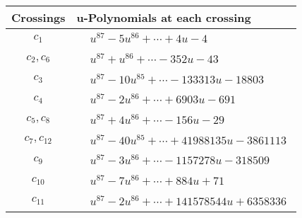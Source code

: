 \documentclass[1p]{elsarticle_modified}
\theoremstyle{definition}
\begin{document}
\begin{tabular}{m{50pt}|m{274pt}}
Crossings & \hspace{64pt}u-Polynomials at each crossing \\
\hline $$\begin{aligned}c_{1}\end{aligned}$$&$\begin{aligned}
&u^{87}-5 u^{86}+\cdots+4 u-4
\end{aligned}$\\
\hline $$\begin{aligned}c_{2},c_{6}\end{aligned}$$&$\begin{aligned}
&u^{87}+u^{86}+\cdots-352 u-43
\end{aligned}$\\
\hline $$\begin{aligned}c_{3}\end{aligned}$$&$\begin{aligned}
&u^{87}-10 u^{85}+\cdots-133313 u-18803
\end{aligned}$\\
\hline $$\begin{aligned}c_{4}\end{aligned}$$&$\begin{aligned}
&u^{87}-2 u^{86}+\cdots+6903 u-691
\end{aligned}$\\
\hline $$\begin{aligned}c_{5},c_{8}\end{aligned}$$&$\begin{aligned}
&u^{87}+4 u^{86}+\cdots-156 u-29
\end{aligned}$\\
\hline $$\begin{aligned}c_{7},c_{12}\end{aligned}$$&$\begin{aligned}
&u^{87}-40 u^{85}+\cdots+41988135 u-3861113
\end{aligned}$\\
\hline $$\begin{aligned}c_{9}\end{aligned}$$&$\begin{aligned}
&u^{87}-3 u^{86}+\cdots-1157278 u-318509
\end{aligned}$\\
\hline $$\begin{aligned}c_{10}\end{aligned}$$&$\begin{aligned}
&u^{87}-7 u^{86}+\cdots+884 u+71
\end{aligned}$\\
\hline $$\begin{aligned}c_{11}\end{aligned}$$&$\begin{aligned}
&u^{87}-2 u^{86}+\cdots+141578544 u+6358336
\end{aligned}$\\
\hline
\end{tabular}\\~\\
\end{document}
